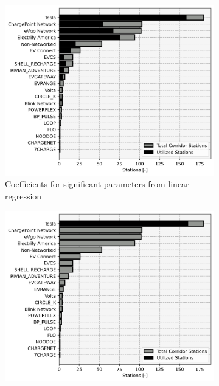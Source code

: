 \begin{figure}[H]

\begin{subfigure}{\linewidth/3}
	\centering\captionsetup{width = .8\linewidth}
	\includegraphics[width = \linewidth]{figs/corridor_station_utilization_0.png}
	\caption{Coefficients for significant parameters from linear regression}
\end{subfigure}%
\begin{subfigure}{\linewidth/3}
	\centering\captionsetup{width = .8\linewidth}
	\includegraphics[width = \linewidth]{figs/corridor_station_utilization_1.png}

\end{subfigure}
\end{figure}
